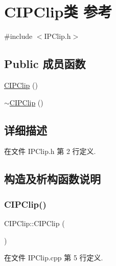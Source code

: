 \hypertarget{class_c_i_p_clip}{}\section{C\+I\+P\+Clip类 参考}
\label{class_c_i_p_clip}


{\ttfamily \#include $<$I\+P\+Clip.\+h$>$}

\subsection*{Public 成员函数}
\begin{DoxyCompactItemize}
\item 
\hyperlink{class_c_i_p_clip_a19ef4a15f778c5d8cb8a064865422ee3}{C\+I\+P\+Clip} ()
\item 
\hyperlink{class_c_i_p_clip_a72b247b0bcf0dc6fcb41986f640bb4fa}{$\sim$\+C\+I\+P\+Clip} ()
\end{DoxyCompactItemize}


\subsection{详细描述}


在文件 I\+P\+Clip.\+h 第 2 行定义.



\subsection{构造及析构函数说明}
\mbox{\label{class_c_i_p_clip_a19ef4a15f778c5d8cb8a064865422ee3}} 
\subsubsection{\texorpdfstring{C\+I\+P\+Clip()}{CIPClip()}}
{\footnotesize\ttfamily C\+I\+P\+Clip\+::\+C\+I\+P\+Clip (\begin{DoxyParamCaption}{ }\end{DoxyParamCaption})}



在文件 I\+P\+Clip.\+cpp 第 5 行定义.

\mbox{\label{class_c_i_p_clip_a72b247b0bcf0dc6fcb41986f640bb4fa}} 
